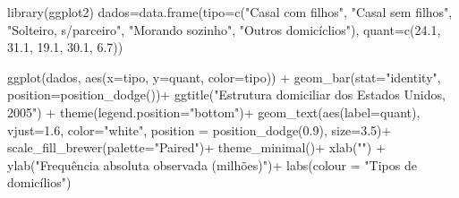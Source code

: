 \documentclass[
]{book}
\newenvironment{Shaded}{\begin{snugshade}}{\end{snugshade}}
\newcommand{\AttributeTok}[1]{\textcolor[rgb]{0.77,0.63,0.00}{#1}}
\newcommand{\FloatTok}[1]{\textcolor[rgb]{0.00,0.00,0.81}{#1}}
\newcommand{\FunctionTok}[1]{\textcolor[rgb]{0.00,0.00,0.00}{#1}}
\newcommand{\NormalTok}[1]{#1}
\newcommand{\OtherTok}[1]{\textcolor[rgb]{0.56,0.35,0.01}{#1}}
\newcommand{\SpecialCharTok}[1]{\textcolor[rgb]{0.00,0.00,0.00}{#1}}
\newcommand{\StringTok}[1]{\textcolor[rgb]{0.31,0.60,0.02}{#1}}
\begin{document}
\begin{Shaded}
\begin{Highlighting}[]
\FunctionTok{library}\NormalTok{(ggplot2)}
\NormalTok{dados}\OtherTok{=}\FunctionTok{data.frame}\NormalTok{(}\AttributeTok{tipo=}\FunctionTok{c}\NormalTok{(}\StringTok{"Casal com filhos"}\NormalTok{,}
                          \StringTok{"Casal sem filhos"}\NormalTok{,}
                          \StringTok{"Solteiro, s/parceiro"}\NormalTok{,}
                          \StringTok{"Morando sozinho"}\NormalTok{,}
                          \StringTok{"Outros domicíclios"}\NormalTok{),}
                 \AttributeTok{quant=}\FunctionTok{c}\NormalTok{(}\FloatTok{24.1}\NormalTok{, }\FloatTok{31.1}\NormalTok{, }
                       \FloatTok{19.1}\NormalTok{, }\FloatTok{30.1}\NormalTok{,}
                       \FloatTok{6.7}\NormalTok{))}

\FunctionTok{ggplot}\NormalTok{(dados, }\FunctionTok{aes}\NormalTok{(}\AttributeTok{x=}\NormalTok{tipo, }\AttributeTok{y=}\NormalTok{quant, }\AttributeTok{color=}\NormalTok{tipo)) }\SpecialCharTok{+}
\FunctionTok{geom\_bar}\NormalTok{(}\AttributeTok{stat=}\StringTok{"identity"}\NormalTok{, }\AttributeTok{position=}\FunctionTok{position\_dodge}\NormalTok{())}\SpecialCharTok{+}
\FunctionTok{ggtitle}\NormalTok{(}\StringTok{"Estrutura domiciliar dos Estados Unidos, 2005"}\NormalTok{) }\SpecialCharTok{+}
\FunctionTok{theme}\NormalTok{(}\AttributeTok{legend.position=}\StringTok{"bottom"}\NormalTok{)}\SpecialCharTok{+}
\FunctionTok{geom\_text}\NormalTok{(}\FunctionTok{aes}\NormalTok{(}\AttributeTok{label=}\NormalTok{quant), }\AttributeTok{vjust=}\FloatTok{1.6}\NormalTok{, }\AttributeTok{color=}\StringTok{"white"}\NormalTok{, }\AttributeTok{position =} \FunctionTok{position\_dodge}\NormalTok{(}\FloatTok{0.9}\NormalTok{), }\AttributeTok{size=}\FloatTok{3.5}\NormalTok{)}\SpecialCharTok{+}
\FunctionTok{scale\_fill\_brewer}\NormalTok{(}\AttributeTok{palette=}\StringTok{"Paired"}\NormalTok{)}\SpecialCharTok{+}
\FunctionTok{theme\_minimal}\NormalTok{()}\SpecialCharTok{+}
\FunctionTok{xlab}\NormalTok{(}\StringTok{""}\NormalTok{)  }\SpecialCharTok{+}
\FunctionTok{ylab}\NormalTok{(}\StringTok{"Frequência absoluta observada (milhões)"}\NormalTok{)}\SpecialCharTok{+}
\FunctionTok{labs}\NormalTok{(}\AttributeTok{colour =} \StringTok{"Tipos de domicílios"}\NormalTok{) }
\end{Highlighting}
\end{Shaded}
\end{document}
